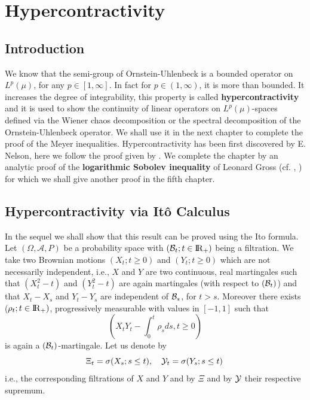 \documentclass[12pt,a4paper]{book}
\newcommand{\calB}{{\cal B}}
\newcommand{\calY}{{\cal Y}}
\newcommand{\R}{{\rm I\!R}}
\begin{document}



\chapter{Hypercontractivity}
\label{ch.hyper}

\section*{Introduction}
We know that the semi-group  of Ornstein-Uhlenbeck is a bounded
operator on $L^p(\mu)$, for any $p\in[1,\infty]$. In fact for
$p\in(1,\infty)$, it is more than bounded. It increases the degree of
integrability, this property is called
{\bf{hypercontractivity}} and it  is used to show the continuity of
linear operators on $L^p(\mu)$-spaces  defined via the Wiener chaos
decomposition or the spectral decomposition of the Ornstein-Uhlenbeck
operator. We shall use it in the next chapter to complete the proof of the
 Meyer inequalities. Hypercontractivity  has been first discovered by
 E. Nelson, here we follow  the proof given by \cite{JN}. We complete
 the chapter by an analytic proof of the
{\bf {logarithmic Sobolev inequality}} of Leonard Gross (cf. \cite{LG},
\cite{D-ST}) for which we shall give another proof in the fifth chapter.


\section{Hypercontractivity via It\^o Calculus}
In the sequel we shall show that this result can be proved using the Ito
formula. Let $(\Omega,{\mathcal A},P)$ be a probability space with
$({\calB}_t;t\in\R_+)$ being a filtration. We take two Brownian
motions $(X_t;t\geq0)$ and $(Y_t;t\geq0)$ which are not necessarily
independent, i.e., $X$ and $Y$ are two continuous, real martingales
such that  $(X_t^2-t)$ and $(Y_t^2-t)$ are again martingales (with
respect  to $({\calB}_t)$) and that $X_t-X_s$ and $Y_t-Y_s$ are
independent  of ${\calB}_s$, for $t>s$. Moreover there exists
($\rho_t;t\in\R_+)$, progressively measurable with values in $[-1,1]$
such that
$$
(X_tY_t-\int_0^t\rho_s ds,t\geq0)
$$
is again a $({\calB}_t)$-martingale. Let us denote by
$$
{\Xi}_t=\sigma(X_s;s\leq t),\quad {\calY}_t=\sigma(Y_s;s\leq t)\,
$$
i.e., the corresponding filtrations of $X$ and $Y$ and by $\Xi$
 and by $\calY$ their respective supremum.
\end{document}
